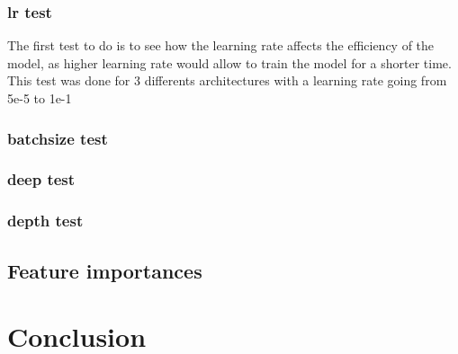\documentclass[a4paper, 11pt]{article}
\begin{document}
    \subsubsection{lr test}
    
    The first test to do is to see how the learning rate affects the efficiency of the model, as higher learning rate would allow to train the model for a shorter time. This test was done for 3 differents architectures with a learning rate going from 5e-5 to 1e-1
    
    \subsubsection{batchsize test}
    
    
    \subsubsection{deep test}
    
    \subsubsection{depth test}
    
    
    
    \subsection{Feature importances}
    
    
    
    \section{Conclusion}
    
    
    
\end{document}
